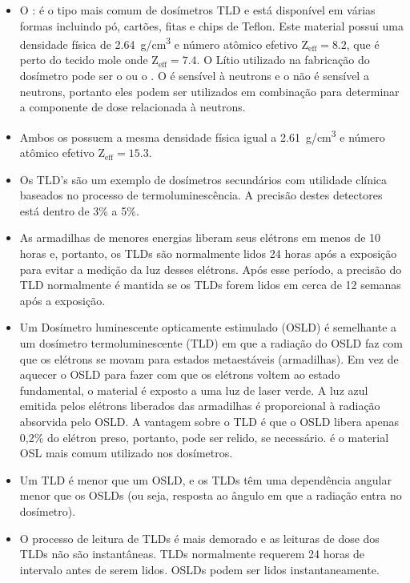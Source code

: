 \documentclass[11pt,a4paper]{article}
\newcounter{exemplo}
\begin{document}
\begin{exemplo}
\begin{itemize}
        \item O : é o tipo mais comum de dosímetros TLD e está disponível em várias formas incluindo pó, cartões, fitas e chips de Teflon. Este material possui uma densidade física de \qty{2.64}{g/cm^3} e número atômico efetivo $\mathrm{Z_{eff} = 8.2}$, que é perto do tecido mole onde $\mathrm{Z_{eff} = 7.4}$. O Lítio utilizado na fabricação do dosímetro pode ser o  ou o . O  é sensível à neutrons e o  não é sensível a neutrons, portanto eles podem ser utilizados em combinação para determinar a componente de dose relacionada à neutrons. 
        
        \item Ambos os  possuem a mesma densidade física igual a \qty{2.61}{g/cm^3} e número atômico efetivo $\mathrm{Z_{eff} = 15.3}$.
        
        \item Os TLD's são um exemplo de dosímetros secundários com utilidade clínica baseados no processo de termoluminescência. A precisão destes detectores está dentro de 3\% a 5\%.
        
        \item As armadilhas de menores energias liberam seus elétrons em menos de 10 horas e, portanto, os TLDs são normalmente lidos 24 horas após a exposição para evitar a medição da luz desses elétrons. Após esse período, a precisão do TLD normalmente é mantida se os TLDs forem lidos em cerca de 12 semanas após a exposição.
        
        \item Um Dosímetro luminescente opticamente estimulado (OSLD) é semelhante a um dosímetro termoluminescente (TLD) em que a radiação do OSLD faz com que os elétrons se movam para estados metaestáveis (armadilhas). Em vez de aquecer o OSLD para fazer com que os elétrons voltem ao estado fundamental, o material é exposto a uma luz de laser verde. A luz azul emitida pelos elétrons liberados das armadilhas é proporcional à radiação absorvida pelo OSLD. A vantagem sobre o TLD é que o OSLD libera apenas 0,2\% do elétron preso, portanto, pode ser relido, se necessário.  é o material OSL mais comum utilizado nos dosímetros.
        
        \item Um TLD é menor que um OSLD, e os TLDs têm uma dependência angular menor que os OSLDs (ou seja, resposta ao ângulo em que a radiação entra no dosímetro).
        
        \item O processo de leitura de TLDs é mais demorado e as leituras de dose dos TLDs não são instantâneas. TLDs normalmente requerem 24 horas de intervalo antes de serem lidos. OSLDs podem ser lidos instantaneamente.
        

\end{itemize}
\end{exemplo}
\end{document}
